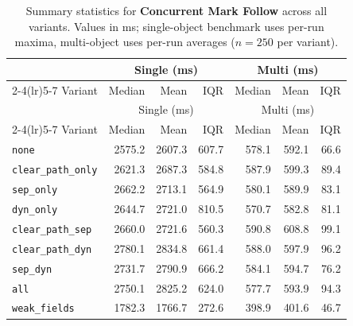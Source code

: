 \begin{longtable}{l rrr rrr}
\caption[Concurrent Mark Follow summary statistics]{Summary statistics for \textbf{Concurrent Mark Follow} across all variants. Values in ms; single-object benchmark uses per-run maxima, multi-object uses per-run averages ($n=250$ per variant).}\label{tab:stats-markfollow} \\
\toprule
 & \multicolumn{3}{c}{Single (ms)} & \multicolumn{3}{c}{Multi (ms)} \\
\cmidrule(lr){2-4}\cmidrule(lr){5-7}
Variant & Median & Mean & IQR & Median & Mean & IQR \\
\midrule
\endfirsthead
\toprule
 & \multicolumn{3}{c}{Single (ms)} & \multicolumn{3}{c}{Multi (ms)} \\
\cmidrule(lr){2-4}\cmidrule(lr){5-7}
Variant & Median & Mean & IQR & Median & Mean & IQR \\
\midrule
\endhead
\bottomrule
\endfoot
\texttt{none} & 2575.2 & 2607.3 & 607.7 & 578.1 & 592.1 & 66.6 \\
\texttt{clear\_path\_only} & 2621.3 & 2687.3 & 584.8 & 587.9 & 599.3 & 89.4 \\
\texttt{sep\_only} & 2662.2 & 2713.1 & 564.9 & 580.1 & 589.9 & 83.1 \\
\texttt{dyn\_only} & 2644.7 & 2721.0 & 810.5 & 570.7 & 582.8 & 81.1 \\
\texttt{clear\_path\_sep} & 2660.0 & 2721.6 & 560.3 & 590.8 & 608.8 & 99.1 \\
\texttt{clear\_path\_dyn} & 2780.1 & 2834.8 & 661.4 & 588.0 & 597.9 & 96.2 \\
\texttt{sep\_dyn} & 2731.7 & 2790.9 & 666.2 & 584.1 & 594.7 & 76.2 \\
\texttt{all} & 2750.1 & 2825.2 & 624.0 & 577.7 & 593.9 & 94.3 \\
\texttt{weak\_fields} & 1782.3 & 1766.7 & 272.6 & 398.9 & 401.6 & 46.7 \\
\end{longtable}
